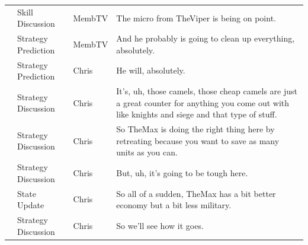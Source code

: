 {\begin{longtable}{@{}>{\theAppRow}r|L{2.3cm}L{1.0cm}U{11.55cm}@{}}
    & Skill Discussion      & MembTV       & The micro from TheViper is being on point.                                                                                                                                                                                                                       \\
    & Strategy Prediction   & MembTV       & And he probably is going to clean up everything, absolutely.                                                                                                                                                                                                     \\
    & Strategy Prediction   & Chris        & He will, absolutely.                                                                                                                                                                                                                                             \\
    & Strategy Discussion   & Chris        & It's, uh, those camels, those cheap camels are just a great counter for anything you come out with like knights and siege and that type of stuff.                                                                                                                \\
    & Strategy Discussion   & Chris        & So TheMax is doing the right thing here by retreating because you want to save as many units as you can.                                                                                                                                                         \\
    & Strategy Discussion   & Chris        & But, uh, it's going to be tough here.                                                                                                                                                                                                                            \\
    & State Update          & Chris        & So all of a sudden, TheMax has a bit better economy but a bit less military.                                                                                                                                                                                     \\
    & Strategy Discussion   & Chris        & So we'll see how it goes.                                                                                                                                                                                                                                        \\

\end{longtable}}
